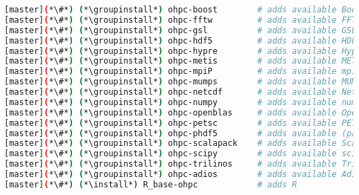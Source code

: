 \begin{lstlisting}[language=bash,keywords={},upquote=true,keepspaces]
[master](*\#*) (*\groupinstall*) ohpc-boost        # adds available Boost packages
[master](*\#*) (*\groupinstall*) ohpc-fftw         # adds available FFTW packages
[master](*\#*) (*\groupinstall*) ohpc-gsl          # adds available GSL packages
[master](*\#*) (*\groupinstall*) ohpc-hdf5         # adds available HDF5 packages
[master](*\#*) (*\groupinstall*) ohpc-hypre        # adds available Hypre packages
[master](*\#*) (*\groupinstall*) ohpc-metis        # adds available METIS packages
[master](*\#*) (*\groupinstall*) ohpc-mpiP         # adds available mpiP packages
[master](*\#*) (*\groupinstall*) ohpc-mumps        # adds available MUMPS packages
[master](*\#*) (*\groupinstall*) ohpc-netcdf       # adds available NetCDF packages
[master](*\#*) (*\groupinstall*) ohpc-numpy        # adds available numerical Python packages
[master](*\#*) (*\groupinstall*) ohpc-openblas     # adds available OpenBLAS packages
[master](*\#*) (*\groupinstall*) ohpc-petsc        # adds available PETSC packages
[master](*\#*) (*\groupinstall*) ohpc-phdf5        # adds available (parallel) HDF5 packages
[master](*\#*) (*\groupinstall*) ohpc-scalapack    # adds available ScaLAPACK packages
[master](*\#*) (*\groupinstall*) ohpc-scipy        # adds available scientific Python packages
[master](*\#*) (*\groupinstall*) ohpc-trilinos     # adds available Trilinos packages
[master](*\#*) (*\groupinstall*) ohpc-adios        # adds available Adios packages
[master](*\#*) (*\install*) R_base-ohpc            # adds R
\end{lstlisting}
